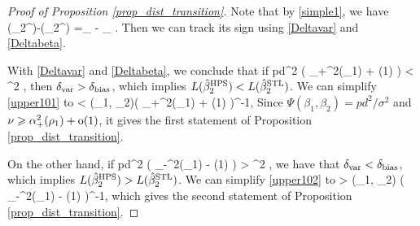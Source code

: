 \begin{proof}[Proof of Proposition \ref{prop_dist_transition}]
Note that by \eqref{simple1}, we have
 \be\label{var-beta}\te(\hat{\beta}_2^{\STL})-\te(\hat{\beta}_2^{\MTL}) =\delta_{\vari} - \delta_{\bias} .\ee
Then we can track its sign using \eqref{Deltavar} and \eqref{Deltabeta}.

\vspace{5pt}

 With \eqref{Deltavar} and \eqref{Deltabeta}, we conclude that if
\be\label{upper101}pd^2 \cdot {} \cdot \left( \al_+^2(\rho_1) +  \oo(1) \right) < \sigma^2  \cdot {},\ee
then $\delta_{\text{var}} > \delta_{\text{bias}}$, which implies $L(\hat{\beta}_2^{\textup{HPS}})<L(\hat{\beta}_2^{\textup{STL}})$. We can simplify \eqref{upper101} to
	\be\label{pos1}    <   \Phi(\rho_1, \rho_2)\cdot \left( \al_+^2(\rho_1) +  \oo(1) \right)^{-1}, \ee
Since $ \Psi(\beta_1,\beta_2)=pd^2/\sigma^2$ and $\nu\geqslant \alpha_+^2(\rho_1) +  \operatorname{o}(1) $, it gives the first statement of Proposition \ref{prop_dist_transition}.	

 \vspace{5pt}
	
 On the other hand, if
\be\label{upper102}pd^2 \cdot {} \cdot \left( \al_-^2(\rho_1) -  \oo(1) \right) > \sigma^2  \cdot {},\ee
	we have that $\delta_{\text{var}} < \delta_{\text{bias}}$, which implies $L(\hat{\beta}_2^{\textup{HPS}})>L(\hat{\beta}_2^{\textup{STL}})$. We can simplify \eqref{upper102} to
	\be\label{neg1}   >  \Phi(\rho_1, \rho_2) \cdot \left( \al_-^2(\rho_1) -  \oo(1) \right)^{-1}, \ee
which gives the second statement of Proposition \ref{prop_dist_transition}.
\end{proof}







